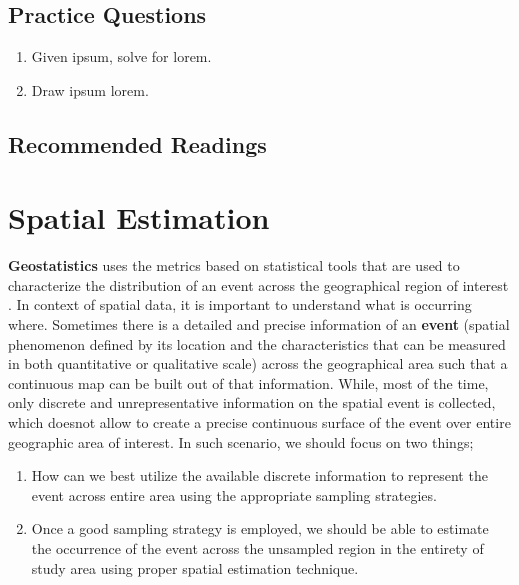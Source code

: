 \documentclass[
]{book}
\providecommand{\tightlist}{%
  \setlength{\itemsep}{0pt}\setlength{\parskip}{0pt}}
\begin{document}
\hypertarget{practice-questions-6}{%
\section*{Practice Questions}\label{practice-questions-6}}

\begin{enumerate}
\def\labelenumi{\arabic{enumi}.}
\setcounter{enumi}{1}
\tightlist
\item
  Given ipsum, solve for lorem.
\item
  Draw ipsum lorem.
\end{enumerate}

\hypertarget{recommended-readings-4}{%
\section*{Recommended Readings}\label{recommended-readings-4}}

\hypertarget{spatial-estimation}{%
\chapter{Spatial Estimation}\label{spatial-estimation}}

\textbf{Geostatistics} uses the metrics based on statistical tools that are used to characterize the distribution of an event across the geographical region of interest \citep{Getis2004}. In context of spatial data, it is important to understand what is occurring where. Sometimes there is a detailed and precise information of an \textbf{event} (spatial phenomenon defined by its location and the characteristics that can be measured in both quantitative or qualitative scale) across the geographical area such that a continuous map can be built out of that information. While, most of the time, only discrete and unrepresentative information on the spatial event is collected, which doesnot allow to create a precise continuous surface of the event over entire geographic area of interest. In such scenario, we should focus on two things;

\begin{enumerate}
\def\labelenumi{\arabic{enumi})}
\item
  How can we best utilize the available discrete information to represent the event across entire area using the appropriate sampling strategies.
\item
  Once a good sampling strategy is employed, we should be able to estimate the occurrence of the event across the unsampled region in the entirety of study area using proper spatial estimation technique.
\end{enumerate}
\end{document}
